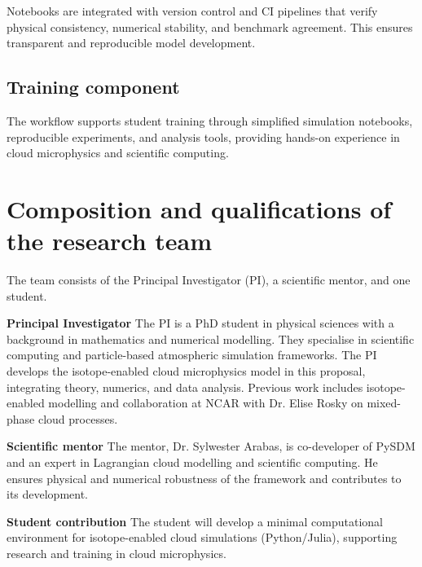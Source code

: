 \documentclass[11pt]{article}
\begin{document}
Notebooks are integrated with version control and CI pipelines that verify physical consistency, numerical stability, and benchmark agreement. This ensures transparent and reproducible model development.

\subsection*{Training component}
The workflow supports student training through simplified simulation notebooks, reproducible experiments, and analysis tools, providing hands-on experience in cloud microphysics and scientific computing.

\section*{Composition and qualifications of the research team}
The team consists of the Principal Investigator (PI), a scientific mentor, and one student.

\noindent\textbf{Principal Investigator}
The PI is a PhD student in physical sciences with a background in mathematics and numerical modelling. They specialise in scientific computing and particle-based atmospheric simulation frameworks. The PI develops the isotope-enabled cloud microphysics model in this proposal, integrating theory, numerics, and data analysis. Previous work includes isotope-enabled modelling and collaboration at NCAR with Dr. Elise Rosky on mixed-phase cloud processes.

\noindent\textbf{Scientific mentor}
The mentor, Dr. Sylwester Arabas, is co-developer of PySDM and an expert in Lagrangian cloud modelling and scientific computing. He ensures physical and numerical robustness of the framework and contributes to its development.

\noindent\textbf{Student contribution}
The student will develop a minimal computational environment for isotope-enabled cloud simulations (Python/Julia), supporting research and training in cloud microphysics.

\appendix

\clearpage
{}
\printbibliography
\end{document}
